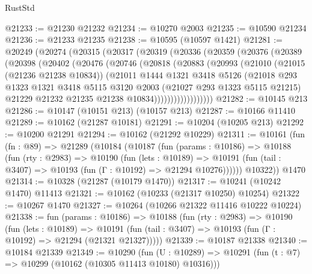 \begin{lexlean}{RustStd}
\begin{coremodule}
@21233 := @21230 @21232
@21234 := @10270 @2003
@21235 := @10590 @21234
@21236 := @21233 @21235
@21238 := @10595 (@10597 @1421)
@21281 := @20249
    (@20274
      (@20315
        (@20317
          (@20319
            (@20336
              (@20359
                (@20376
                  (@20389
                    (@20398
                      (@20402
                        (@20476
                          (@20746
                            (@20818
                              (@20883
                                (@20993
                                  (@21010
                                    (@21015 (@21236 @21238 @10834))
                                    (@21011
                                      @1444
                                      @1321
                                      @3418
                                      @5126
                                      (@21018
                                        @293
                                        @1323
                                        @1321
                                        @3418
                                        @5115
                                        @3120
                                        @2003
                                        (@21027 @293 @1323 @5115 @21215)
                                        @21229
                                        @21232
                                        @21235
                                        @21238
                                        @10834))))))))))))))))))
@21282 := @10145 @213
@21286 := @10147 (@10151 @213) (@10157 @213)
@21287 := @10166 @11410
@21289 := @10162 (@21287 @10181)
@21291 := @10204 (@10205 @213)
@21292 := @10200 @21291
@21294 := @10162 (@21292 @10229)
@21311 := @10161
    (fun (fn : @89) =>
    @21289
      (@10184
        (@10187
          (fun (params : @10186) =>
          @10188
            (fun (rty : @2983) =>
            @10190
              (fun (lets : @10189) =>
              @10191 (fun (tail : @3407) => @10193 (fun (Γ : @10192) => @21294 @10276))))))
        @10322))
    @1470
@21314 := @10328 (@21287 (@10179 @1470))
@21317 := @10241 (@10242 @1470) @11413
@21321 := @10162 (@10233 (@21317 @10250) @10254)
@21322 := @10267 @1470
@21327 := @10264 (@10266 @21322 @11416 @10222 @10224)
@21338 := fun (params : @10186) =>
  @10188
    (fun (rty : @2983) =>
    @10190
      (fun (lets : @10189) =>
      @10191 (fun (tail : @3407) => @10193 (fun (Γ : @10192) => @21294 (@21321 @21327)))))
@21339 := @10187 @21338
@21340 := @10184 @21339
@21349 := @10290
    (fun (U : @10289) => @10291 (fun (t : @7) => @10299 (@10162 (@10305 @11413 @10180) @10316)))

\end{coremodule}
\end{lexlean}
